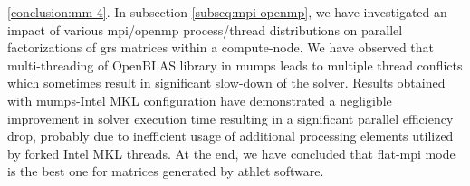


	
\ref{conclusion:mm-4}. In subsection \ref{subseq:mpi-openmp}, we have investigated an impact of various
\acrshort{mpi}/\acrshort{openmp} process/thread distributions on parallel factorizations of \acrshort{grs} matrices  within a compute-node. We have observed that multi-threading of
OpenBLAS library in \acrshort{mumps} leads to multiple thread conflicts which sometimes result in significant slow-down of the solver. Results obtained with \acrshort{mumps}-Intel MKL configuration have demonstrated a negligible improvement in solver execution time resulting in a significant parallel efficiency drop, probably due to inefficient usage of additional processing elements utilized by forked Intel MKL threads. At the end, we have concluded that flat-\acrshort{mpi} mode is the best one for matrices generated by \acrshort{athlet} software.\\






